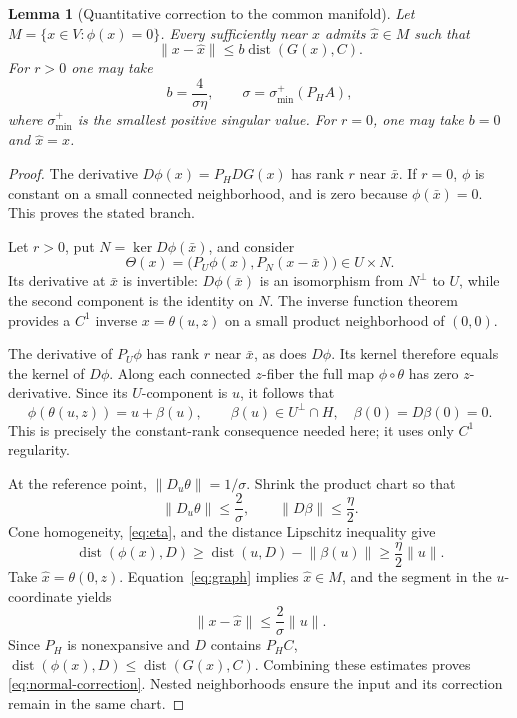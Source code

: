 \documentclass[11pt]{article}
\numberwithin{equation}{section}
\newtheorem{lemma}[theorem]{Lemma}
\theoremstyle{definition}
\theoremstyle{remark}
\DeclareMathOperator{\dist}{dist}
\newcommand{\xb}{\bar x}
\newcommand{\xhat}{\widehat x}
\newcommand{\norm}[1]{\lVert #1\rVert}
\newcommand{\dset}[2]{\dist(#1,#2)}
\begin{document}
\begin{lemma}[Quantitative correction to the common manifold]
\label{lem:normal-correction}
Let $M=\{x\in V:\phi(x)=0\}$. Every sufficiently near $x$ admits
$\xhat\in M$ such that
\begin{equation}
 \norm{x-\xhat}\leq b\dset{G(x)}{C}.
 \label{eq:normal-correction}
\end{equation}
For $r>0$ one may take
\begin{equation}
 b=\frac{4}{\sigma\eta},\qquad
 \sigma=\sigma_{\min}^{+}(P_HA),
 \label{eq:b}
\end{equation}
where $\sigma_{\min}^{+}$ is the smallest positive singular value.
For $r=0$, one may take $b=0$ and $\xhat=x$.
\end{lemma}
\begin{proof}
The derivative $D\phi(x)=P_HDG(x)$ has rank $r$ near $\xb$.
If $r=0$, $\phi$ is constant on a small connected neighborhood, and is
zero because $\phi(\xb)=0$. This proves the stated branch.

Let $r>0$, put $N=\ker D\phi(\xb)$, and consider
\[
 \Theta(x)=\bigl(P_U\phi(x),P_N(x-\xb)\bigr)\in U\times N.
\]
Its derivative at $\xb$ is invertible: $D\phi(\xb)$ is an isomorphism
from $N^\perp$ to $U$, while the second component is the identity on $N$.
The inverse function theorem provides a $C^1$ inverse $x=\theta(u,z)$
on a small product neighborhood of $(0,0)$.

The derivative of $P_U\phi$ has rank $r$ near $\xb$, as does
$D\phi$. Its kernel therefore equals the kernel of $D\phi$.
Along each connected $z$-fiber the full map $\phi\circ\theta$ has zero
$z$-derivative. Since its $U$-component is $u$, it follows that
\begin{equation}
 \phi(\theta(u,z))=u+\beta(u),\qquad
 \beta(u)\in U^\perp\cap H,\quad \beta(0)=D\beta(0)=0.
 \label{eq:graph}
\end{equation}
This is precisely the constant-rank consequence needed here; it uses
only $C^1$ regularity.

At the reference point, $\norm{D_u\theta}=1/\sigma$.
Shrink the product chart so that
\[
 \norm{D_u\theta}\leq\frac{2}{\sigma},
 \qquad \norm{D\beta}\leq\frac{\eta}{2}.
\]
Cone homogeneity, \eqref{eq:eta}, and the distance Lipschitz inequality give
\[
 \dset{\phi(x)}{D}
 \geq\dset{u}{D}-\norm{\beta(u)}
 \geq\frac{\eta}{2}\norm{u}.
\]
Take $\xhat=\theta(0,z)$. Equation~\eqref{eq:graph} implies
$\xhat\in M$, and the segment in the $u$-coordinate yields
\[
 \norm{x-\xhat}\leq\frac{2}{\sigma}\norm{u}.
\]
Since $P_H$ is nonexpansive and $D$ contains $P_HC$,
$\dset{\phi(x)}{D}\leq\dset{G(x)}{C}$.
Combining these estimates proves \eqref{eq:normal-correction}.
Nested neighborhoods ensure the input and its correction remain in the
same chart.
\end{proof}
\end{document}
